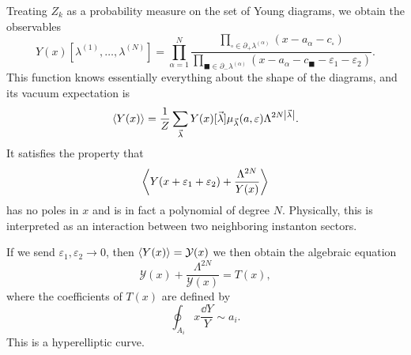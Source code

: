 \documentclass[leqno, openany]{memoir}
\theoremstyle{definition}
\theoremstyle{remark}
\theoremstyle{plain}
\theoremstyle{definition}
\theoremstyle{remark}
\newcommand{\ep}{\varepsilon}
\newcommand{\mc}[1]{\mathcal{#1}}
\begin{document}
Treating $Z_k$ as a probability measure on the set of Young diagrams, we obtain the observables
\[ Y(x)[\lambda^{(1)}, \ldots, \lambda^{(N)}] = \prod_{\alpha =1}^N \frac{\prod_{\square \in \partial_+ \lambda^{(\alpha)}}(x-a_{\alpha}-c_{\square})}{\prod_{\blacksquare \in \partial_- \lambda^{(\alpha)}}(x-a_{\alpha}-c_{\blacksquare}-\ep_1-\ep_2)}. \]
This function knows essentially everything about the shape of the diagrams, and its vacuum expectation is
\[ \ev{Y(x)} = \frac{1}{Z} \sum_{\vec{\lambda}} Y(x)[\vec{\lambda}] \mu_{\vec{\lambda}}(a,\ep) \Lambda^{2N\abs{\vec{\lambda}}}. \]
It satisfies the property that
\[ \ev{Y(x+\ep_1 + \ep_2) + \frac{\Lambda^{2N}}{Y(x)}} \]
has no poles in $x$ and is in fact a polynomial of degree $N$. Physically, this is interpreted as an interaction between two neighboring instanton sectors.

If we send $\ep_1, \ep_2 \to 0$, then $\ev{Y(x)} = \mc{Y}(x)$ we then obtain the algebraic equation
\[ \mc{Y}(x) + \frac{\Lambda^{2N}}{\mc{Y}(x)} = T(x), \]
where the coefficients of $T(x)$ are defined by
\[ \oint_{A_i} x \frac{\dd Y}{Y} \sim a_i. \]
This is a hyperelliptic curve.
\end{document}
